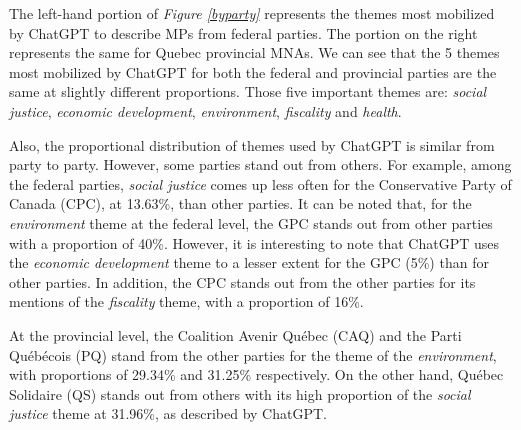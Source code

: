 \documentclass{article}
\begin{document}
The left-hand portion of \textit{Figure \ref{byparty}} represents the themes most mobilized by ChatGPT to describe MPs from federal parties. The portion on the right represents the same for Quebec provincial MNAs. We can see that the 5 themes most mobilized by ChatGPT for both the federal and provincial parties are the same at slightly different proportions. Those five important themes are: \textit{social justice}, \textit{economic development}, \textit{environment}, \textit{fiscality} and \textit{health}. \par
Also, the proportional distribution of themes used by ChatGPT is similar from party to party. However, some parties stand out from others. For example, among the federal parties, \textit{social justice} comes up less often for the Conservative Party of Canada (CPC), at 13.63\%, than other parties. It can be noted that, for the \textit{environment} theme at the federal level, the GPC stands out from other parties with a proportion of 40\%. However, it is interesting to note that ChatGPT uses the \textit{economic development} theme to a lesser extent for the GPC (5\%) than for other parties. In addition, the CPC stands out from the other parties for its mentions of the \textit{fiscality} theme, with a proportion of 16\%. \par
At the provincial level, the Coalition Avenir Québec (CAQ) and the Parti Québécois (PQ) stand from the other parties for the theme of the \textit{environment}, with proportions of 29.34\% and 31.25\% respectively. On the other hand, Québec Solidaire (QS) stands out from others with its high proportion of the \textit{social justice} theme at 31.96\%, as described by ChatGPT. 
\end{document}
